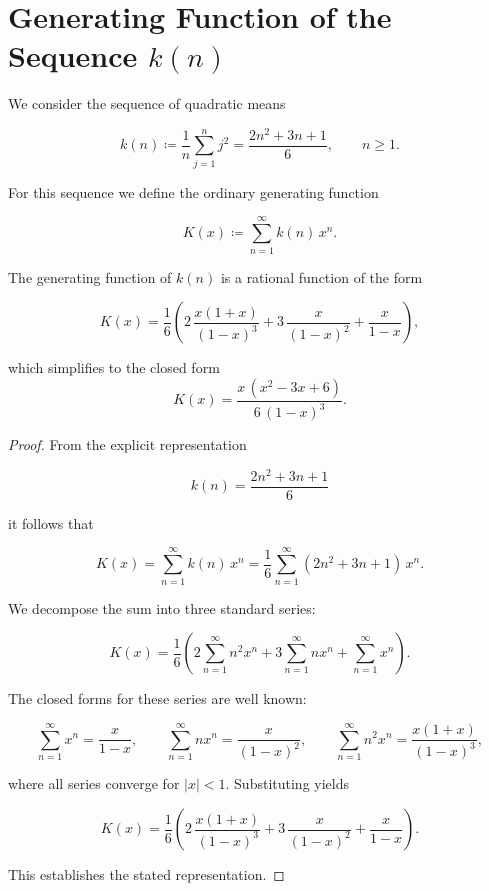 \section{Generating Function of the Sequence \texorpdfstring{$k(n)$}{k(n)}}

We consider the sequence of quadratic means


\[
  k(n) \coloneqq \frac{1}{n}\sum_{j=1}^{n} j^{2}
  = \frac{2n^{2} + 3n + 1}{6}, \qquad n \ge 1.
\]



For this sequence we define the ordinary generating function


\[
  K(x) \coloneqq \sum_{n=1}^{\infty} k(n)\,x^{n}.
\]



\begin{theorem}
The generating function of $k(n)$ is a rational function of the form


\[
  K(x)
  = \frac{1}{6}\left(
      2\,\frac{x(1+x)}{(1-x)^{3}}
      + 3\,\frac{x}{(1-x)^{2}}
      + \frac{x}{1-x}
    \right),
\]


which simplifies to the closed form
\begin{equation}
  K(x) = \frac{x\,(x^2 - 3x + 6)}{6\,(1-x)^3}.
\end{equation}


\end{theorem}

\begin{proof}
From the explicit representation


\[
  k(n) = \frac{2n^{2} + 3n + 1}{6}
\]


it follows that


\[
  K(x)
  = \sum_{n=1}^{\infty} k(n)\,x^{n}
  = \frac{1}{6}\sum_{n=1}^{\infty} (2n^{2} + 3n + 1)\,x^{n}.
\]


We decompose the sum into three standard series:


\[
  K(x)
  = \frac{1}{6}\left(
      2\sum_{n=1}^{\infty} n^{2}x^{n}
      + 3\sum_{n=1}^{\infty} n x^{n}
      + \sum_{n=1}^{\infty} x^{n}
    \right).
\]


The closed forms for these series are well known:


\[
  \sum_{n=1}^{\infty} x^{n} = \frac{x}{1-x}, \qquad
  \sum_{n=1}^{\infty} n x^{n} = \frac{x}{(1-x)^{2}}, \qquad
  \sum_{n=1}^{\infty} n^{2} x^{n} = \frac{x(1+x)}{(1-x)^{3}},
\]


where all series converge for $|x|<1$. Substituting yields


\[
  K(x)
  = \frac{1}{6}\left(
      2\,\frac{x(1+x)}{(1-x)^{3}}
      + 3\,\frac{x}{(1-x)^{2}}
      + \frac{x}{1-x}
    \right).
\]


This establishes the stated representation.
\end{proof}

